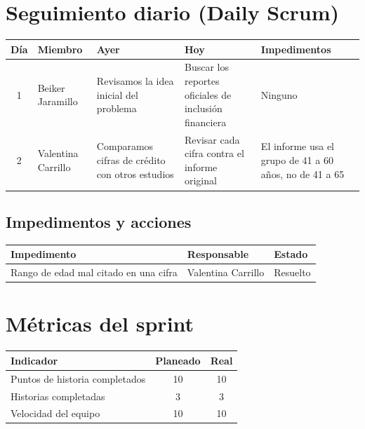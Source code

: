 \documentclass[11pt,a4paper]{article}
\begin{document}
\section{Seguimiento diario (Daily Scrum)}

\begin{tabularx}{\textwidth}{c l X X X}
  \toprule
  \textbf{Día} & \textbf{Miembro} & \textbf{Ayer} & \textbf{Hoy} & \textbf{Impedimentos} \\
  \midrule
  1 & Beiker Jaramillo & Revisamos la idea inicial del problema & Buscar los reportes oficiales de inclusión financiera & Ninguno \\
  2 & Valentina Carrillo & Comparamos cifras de crédito con otros estudios & Revisar cada cifra contra el informe original & El informe usa el grupo de 41 a 60 años, no de 41 a 65 \\
  \bottomrule
\end{tabularx}

\subsection{Impedimentos y acciones}

\begin{tabularx}{\textwidth}{X l l}
  \toprule
  \textbf{Impedimento} & \textbf{Responsable} & \textbf{Estado} \\
  \midrule
  Rango de edad mal citado en una cifra & Valentina Carrillo & Resuelto \\
  \bottomrule
\end{tabularx}

\section{Métricas del sprint}

\begin{tabularx}{\textwidth}{X c c}
  \toprule
  \textbf{Indicador} & \textbf{Planeado} & \textbf{Real} \\
  \midrule
  Puntos de historia completados & 10 & 10 \\
  Historias completadas          & 3 & 3 \\
  Velocidad del equipo           & 10 & 10 \\
  \bottomrule
\end{tabularx}

\end{document}
